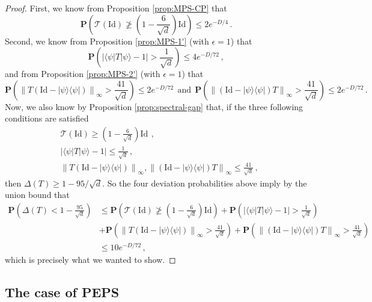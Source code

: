 \documentclass{amsart}
\renewcommand{\P}{\mathbf{P}}
\renewcommand{\leq}{\leqslant}
\renewcommand{\geq}{\geqslant}
\newcommand{\Id}{\mathrm{Id}}
\newcommand{\ketbra}[2]{| #1 \rangle\!\langle #2 |}
\newcommand{\bra}[1]{\langle #1 |}
\newcommand{\ket}[1]{| #1 \rangle}
\begin{document}
\begin{proof}
    First, we know from Proposition \ref{prop:MPS-CP} that
    \[ \P \left( \mathcal T(\Id) \ngeq \left(1-\frac{6}{\sqrt{d}}\right)\Id \right) \leq 2e^{-D/4} \, . \]
    Second, we know from Proposition \ref{prop:MPS-1'} (with $\epsilon=1$) that
    \[ \P \left( \left| \bra{\psi}T\ket{\psi} -1 \right| > \frac{1}{\sqrt{d}} \right) \leq 4e^{-D/72} \, , \]
    and from Proposition \ref{prop:MPS-2'} (with $\epsilon=1$) that
    \[ \P\left( \left\|T\left(\Id-\ketbra{\psi}{\psi}\right) \right\|_{\infty} > \frac{41}{\sqrt{d}} \right) \leq 2e^{-D/72} \ \ \text{and} \ \ \P\left( \left\|\left(\Id-\ketbra{\psi}{\psi}\right)T \right\|_{\infty} > \frac{41}{\sqrt{d}} \right) \leq 2e^{-D/72} \, . \]
    Now, we also know by Proposition \ref{prop:spectral-gap} that, if the three following conditions are satisfied
    \begin{align*}
         & \mathcal T(\Id) \geq \left(1-\frac{6}{\sqrt{d}}\right)\Id\ \, ,                                                                                              \\
         & \left| \bra{\psi}T\ket{\psi} -1 \right| \leq \frac{1}{\sqrt{d}} \, ,                                                                                         \\
         & \left\|T\left(\Id-\ketbra{\psi}{\psi}\right) \right\|_{\infty}, \left\|\left(\Id-\ketbra{\psi}{\psi}\right)T \right\|_{\infty} \leq \frac{41}{\sqrt{d}} \, ,
    \end{align*}
    then $\Delta(T)\geq 1-95/\sqrt{d}$. So the four deviation probabilities above imply by the union bound that
    \begin{align*}
        \P\left( \Delta(T) < 1-\frac{95}{\sqrt{d}} \right)
         & \leq \P \left( \mathcal T(\Id) \ngeq \left(1-\frac{6}{\sqrt{d}}\right)\Id \right) + \P\left( \left| \bra{\psi}T\ket{\psi} -1 \right| > \frac{1}{\sqrt{d}} \right)                                                 \\
         & + \P\left( \left\| T\left(\Id-\ketbra{\psi}{\psi}\right) \right\|_{\infty} > \frac{41}{\sqrt{d}} \right) + \P\left( \left\| \left(\Id-\ketbra{\psi}{\psi}\right)T \right\|_{\infty} > \frac{41}{\sqrt{d}} \right) \\
         & \leq 10e^{-D/72} \, ,
    \end{align*}
    which is precisely what we wanted to show.
\end{proof}

\subsection{The case of PEPS} \hfill\par\smallskip
\label{sec:transfer-operator-PEPS}
\end{document}
